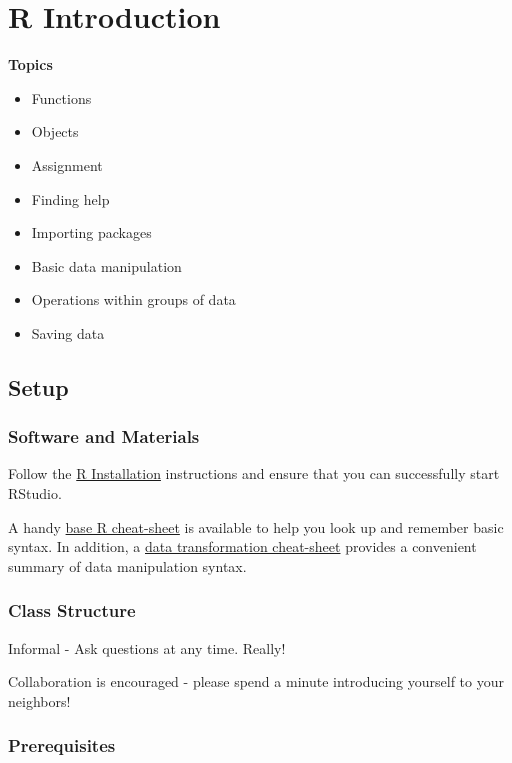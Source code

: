 \documentclass[]{book}
\providecommand{\tightlist}{%
  \setlength{\itemsep}{0pt}\setlength{\parskip}{0pt}}
\begin{document}
\hypertarget{r-introduction}{%
\chapter{R Introduction}\label{r-introduction}}

\textbf{Topics}

\begin{itemize}
\tightlist
\item
  Functions
\item
  Objects
\item
  Assignment
\item
  Finding help
\item
  Importing packages
\item
  Basic data manipulation
\item
  Operations within groups of data
\item
  Saving data
\end{itemize}

\hypertarget{setup}{%
\section{Setup}\label{setup}}

\hypertarget{software-and-materials}{%
\subsection{Software and Materials}\label{software-and-materials}}

Follow the \href{./Rinstall.html}{R Installation} instructions and ensure that you can successfully start RStudio.

A handy \href{R/Rintro/base-r-cheat-sheet.pdf}{base R cheat-sheet} is available to help you look up and remember basic syntax.
In addition, a \href{R/Rintro/data-transformation-cheat-sheet.pdf}{data transformation cheat-sheet} provides a convenient summary of data manipulation syntax.

\hypertarget{class-structure}{%
\subsection{Class Structure}\label{class-structure}}

Informal - Ask questions at any time. Really!

Collaboration is encouraged - please spend a minute introducing yourself to your neighbors!

\hypertarget{prerequisites}{%
\subsection{Prerequisites}\label{prerequisites}}
\end{document}
